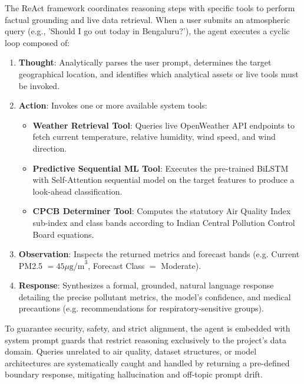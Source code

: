 \documentclass[conference]{IEEEtran}
\begin{document}
The ReAct framework coordinates reasoning steps with specific tools to perform factual grounding and live data retrieval. When a user submits an atmospheric query (e.g., 'Should I go out today in Bengaluru?'), the agent executes a cyclic loop composed of:
\begin{enumerate}
\item \textbf{Thought}: Analytically parses the user prompt, determines the target geographical location, and identifies which analytical assets or live tools must be invoked.
\item \textbf{Action}: Invokes one or more available system tools:
\begin{itemize}
\item \textbf{Weather Retrieval Tool}: Queries live OpenWeather API endpoints to fetch current temperature, relative humidity, wind speed, and wind direction.
\item \textbf{Predictive Sequential ML Tool}: Executes the pre-trained BiLSTM with Self-Attention sequential model on the target features to produce a look-ahead classification.
\item \textbf{CPCB Determiner Tool}: Computes the statutory Air Quality Index sub-index and class bands according to Indian Central Pollution Control Board equations.
\end{itemize}
\item \textbf{Observation}: Inspects the returned metrics and forecast bands (e.g. Current PM2.5 $= 45\mu\text{g/m}^3$, Forecast Class $=$ Moderate).
\item \textbf{Response}: Synthesizes a formal, grounded, natural language response detailing the precise pollutant metrics, the model's confidence, and medical precautions (e.g. recommendations for respiratory-sensitive groups).
\end{enumerate}

To guarantee security, safety, and strict alignment, the agent is embedded with system prompt guards that restrict reasoning exclusively to the project's data domain. Queries unrelated to air quality, dataset structures, or model architectures are systematically caught and handled by returning a pre-defined boundary response, mitigating hallucination and off-topic prompt drift.
\end{document}
